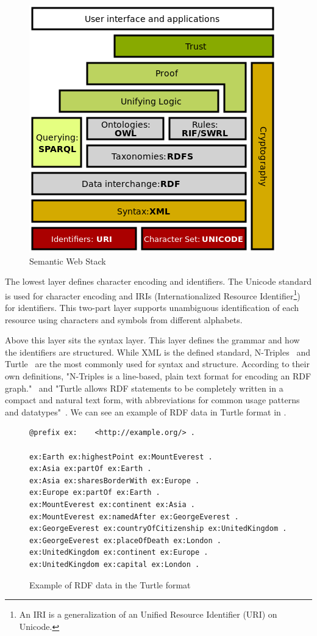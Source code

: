 \begin{figure}[H]
    \centering
        \includegraphics[width=.5\linewidth]{imagenes/Semantic_web_stack.png}
        \caption{Semantic Web Stack \cite{SemanticWebWikipedia}}
        \label{fig:semanticWebStack}
\end{figure}

The lowest layer defines character encoding and identifiers. The Unicode standard is used for character encoding and IRIs (Internationalized Resource Identifier\footnote{An IRI is a generalization of an Unified Resource Identifier (URI) on Unicode.}) for identifiers. This two-part layer supports unambiguous identification of each resource using characters and symbols from different alphabets.

Above this layer sits the syntax layer. This layer defines the grammar and how the identifiers are structured. While XML is the defined standard, N-Triples~\cite{nTriples} and Turtle~\cite{Turtle}  are the most commonly used for syntax and structure. According to their own definitions, "N-Triples is a line-based, plain text format for encoding an RDF graph."~\cite{nTriples} and "Turtle allows RDF statements to be completely written in a compact and natural text form, with abbreviations for common usage patterns and datatypes"~\cite{Turtle}. We can see an example of RDF data in Turtle format in . 

\begin{figure}[H]
\begin{verbatim}
@prefix ex:    <http://example.org/> .

ex:Earth ex:highestPoint ex:MountEverest .
ex:Asia ex:partOf ex:Earth .
ex:Asia ex:sharesBorderWith ex:Europe .
ex:Europe ex:partOf ex:Earth .
ex:MountEverest ex:continent ex:Asia .
ex:MountEverest ex:namedAfter ex:GeorgeEverest .
ex:GeorgeEverest ex:countryOfCitizenship ex:UnitedKingdom .
ex:GeorgeEverest ex:placeOfDeath ex:London .
ex:UnitedKingdom ex:continent ex:Europe .
ex:UnitedKingdom ex:capital ex:London .
\end{verbatim}
\caption{Example of RDF data in the Turtle format}
\label{fig:turtleExample}
\end{figure}

